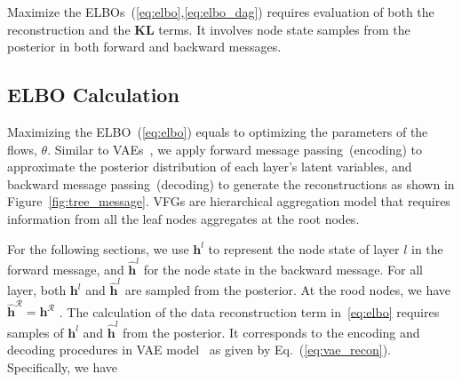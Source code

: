 \documentclass[sigconf, anonymous, review]{acmart}
\theoremstyle{plain}
\theoremstyle{definition}
\theoremstyle{remark}
\begin{document}
Maximize the ELBOs~(\ref{eq:elbo},\ref{eq:elbo_dag}) requires evaluation of both the reconstruction and the $\mathbf{KL}$ terms. It involves node state samples from the posterior in both forward and backward messages.%



\subsection{ELBO Calculation}
Maximizing the ELBO~(\ref{eq:elbo}) equals to  optimizing the parameters of the flows, $\theta$.  Similar to VAEs~\cite{kingma2013auto,rezende2014stochastic}, we apply forward message passing~(encoding) to approximate the posterior  distribution of each layer's latent variables, and backward message passing~(decoding) to  generate the reconstructions as shown in Figure~\ref{fig:tree_message}. VFGs are hierarchical aggregation model that requires  information from all the leaf nodes  aggregates at the root nodes. 

For the following sections, we use $\mathbf{h}^l$ to represent the node state of layer $l$ in the forward message, and $\widehat{\mathbf{h}}^l$ for the node state in the backward message. For all layer, both $\mathbf{h}^l$ and $\widehat{\mathbf{h}}^l$  are sampled from the posterior. At the rood nodes, we have  $\widehat{\mathbf{h}}^{\mathcal{R}}=\mathbf{h}^{\mathcal{R}}$ . 
The calculation of the data reconstruction term in~\eqref{eq:elbo} requires  samples of  $\mathbf{h}^l$ and $\widehat{\mathbf{h}}^l$ from the posterior. It corresponds to the encoding and decoding procedures in VAE model~\cite{kingma2013auto,rezende2014stochastic} as given by Eq.~(\ref{eq:vae_recon}). Specifically, we have
\end{document}
